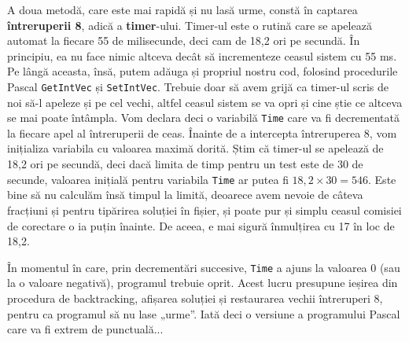 A doua metodă, care este mai rapidă și nu lasă urme, constă în captarea {\bf
  întreruperii 8}, adică a {\bf timer}-ului. Timer-ul este o rutină care se
apelează automat la fiecare 55 de milisecunde, deci cam de 18,2 ori pe
secundă. În principiu, ea nu face nimic altceva decât să incrementeze ceasul
sistem cu 55 ms. Pe lângă aceasta, însă, putem adăuga și propriul nostru cod,
folosind procedurile Pascal {\tt GetIntVec} și {\tt SetIntVec}. Trebuie doar
să avem grijă ca timer-ul scris de noi să-l apeleze și pe cel vechi, altfel
ceasul sistem se va opri și cine știe ce altceva se mai poate întâmpla. Vom
declara deci o variabilă {\tt Time} care va fi decrementată la fiecare apel al
întreruperii de ceas. Înainte de a intercepta întreruperea 8, vom inițializa
variabila cu valoarea maximă dorită. Știm că timer-ul se apelează de 18,2 ori
pe secundă, deci dacă limita de timp pentru un test este de 30 de secunde,
valoarea inițială pentru variabila {\tt Time} ar putea fi $18,2 \times 30 =
546$. Este bine să nu calculăm însă timpul la limită, deoarece avem nevoie de
câteva fracțiuni și pentru tipărirea soluției în fișier, și poate pur și
simplu ceasul comisiei de corectare o ia puțin înainte. De aceea, e mai sigură
înmulțirea cu 17 în loc de 18,2.

În momentul în care, prin decrementări succesive, {\tt Time} a ajuns la
valoarea 0 (sau la o valoare negativă), programul trebuie oprit. Acest lucru
presupune ieșirea din procedura de backtracking, afișarea soluției și
restaurarea vechii întreruperi 8, pentru ca programul să nu lase „urme”. Iată
deci o versiune a programului Pascal care va fi extrem de punctuală...

